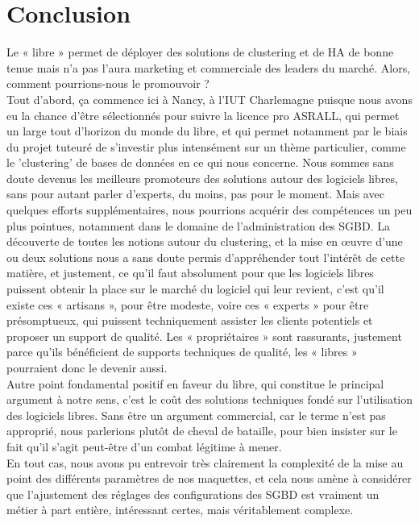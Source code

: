 \documentclass[12pt]{report}
\begin{document}
\chapter*{Conclusion}

Le « libre » permet de déployer des solutions de clustering et de HA de bonne
tenue mais n'a pas l'aura marketing et commerciale des leaders du
marché. Alors, comment pourrions-nous le promouvoir ?\\

Tout d'abord, ça commence ici à Nancy, à l'IUT Charlemagne puisque nous avons eu
la chance d'être sélectionnés pour suivre la licence pro ASRALL, qui permet un
large tout d'horizon du monde du libre, et qui permet notamment par le biais du
projet tuteuré de s'investir plus intensément sur un thème particulier, comme le
'clustering' de bases de données en ce qui nous concerne. Nous sommes sans
doute devenus les meilleurs promoteurs des solutions autour des logiciels
libres, sans pour autant parler d'experts, du moins, pas pour le moment. Mais
avec quelques efforts supplémentaires, nous pourrions acquérir des
compétences un peu plus pointues, notamment dans le domaine de l'administration
des SGBD. La découverte de toutes les notions autour du clustering, et la mise
en œuvre d'une ou deux solutions nous a sans doute permis d'appréhender tout
l'intérêt de cette matière, et justement, ce qu'il faut absolument pour que les
logiciels libres puissent obtenir la place sur le marché du logiciel qui leur
revient, c'est qu'il existe ces « artisans », pour être modeste, voire ces
« experts » pour être présomptueux, qui puissent techniquement assister les
clients potentiels et proposer un support de qualité. Les « propriétaires » sont
rassurants, justement parce qu'ils bénéficient de supports techniques de
qualité, les « libres » pourraient donc le devenir aussi.\\

Autre point fondamental positif en faveur du libre, qui constitue le principal
argument à notre sens, c'est le coût des solutions techniques fondé sur
l'utilisation des logiciels libres. Sans être un argument commercial, car le
terme n'est pas approprié, nous parlerions plutôt de cheval de bataille, pour bien
insister sur le fait qu'il s'agit peut-être d'un combat légitime à mener.\\

En tout cas, nous avons pu entrevoir très clairement la complexité de la mise au
point des différents paramètres de nos maquettes, et cela nous amène à
considérer que l'ajustement des réglages des configurations des SGBD est
vraiment un métier à part entière, intéressant certes, mais véritablement
complexe. \\
\end{document}
